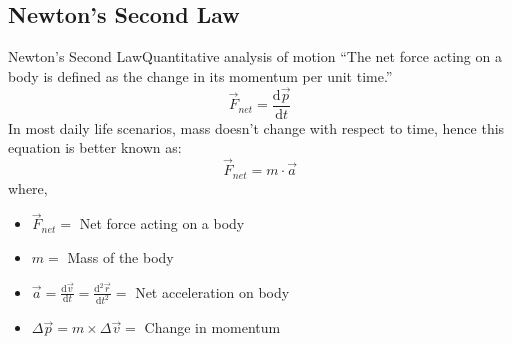 





\subsection{Newton's Second Law}
\begin{frame}{Newton's Second Law}{Quantitative analysis of motion}
	``The net force acting on a body is defined as the change in its 
	momentum per unit time.''
	\begin{equation}
	\vec{F}_{net} = \frac{\mathrm{d}\vec{p}}{\mathrm{d}t}
	\end{equation}
	In most daily life scenarios, mass doesn't change with respect to
	time, hence this equation is better known as:
	\[\vec{F}_{net} = m\cdot\vec{a}\]
	where,
	\begin{itemize}
	\item \(\vec{F}_{net} = \) Net force acting on a body
	\item \(m = \) Mass of the body
	\item \(\vec{a} = \frac{\mathrm{d}\vec{v}}{\mathrm{d}t} 
		= \frac{\mathrm{d}^2\vec{r}}{\mathrm{d}t^2} = \) 
		Net acceleration on body	
	\item \(\Delta\vec{p} = m\times\Delta\vec{v} = \)
		Change in momentum
	\end{itemize}
\end{frame}

